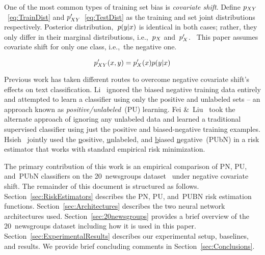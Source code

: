 \documentclass[]{subfiles}
\begin{document}
One of the most common types of training set bias is \textit{covariate shift}. Define $p_{XY}$~\eqref{eq:TrainDist} and ${p_{XY}'}$~\eqref{eq:TestDist} as the training and set joint distributions respectively.  Posterior distribution,~${p(y \vert x)}$ is identical in both cases; rather, they only differ in their marginal distributions, i.e.,~$p_{X}$ and~${p_{X}'}$.~\cite{Huang:2006}  This paper assumes covariate shift for only one class, i.e.,~the negative one.

\begin{equation}\label{eq:TestDist}
    p_{XY}'(x,y) = p_{X}'(x) p(y \vert x)
\end{equation}

Previous work has taken different routes to overcome negative covariate shift's effects on text classification.  Li\etal~\cite{Li:2010} ignored the biased negative training data entirely and attempted to learn a classifier using only the positive and unlabeled sets -- an approach known as \textit{positive\-/unlabeled}~(PU) learning.  Fei \&~Liu~\cite{Fei:2015} took the alternate approach of ignoring any unlabeled data and learned a traditional supervised classifier using just the positive and biased-negative training examples.  Hsieh\etal~\cite{Hsieh:2018} jointly used the \underline{p}ositive, \underline{u}nlabeled, and \underline{b}iased \underline{n}egative~(PUbN) in a risk estimator that works with standard empirical risk minimization.

The primary contribution of this work is an empirical comparison of PN, PU, and~PUbN classifiers on the 20~newsgroups dataset~\cite{20newsgroups} under negative covariate shift.  The remainder of this document is structured as follows.  Section~\ref{sec:RiskEstimators} describes the PN, PU, and~PUBN risk estimation functions. Section~\ref{sec:Architectures} describes the two neural network architectures used. Section~\ref{sec:20newsgroups} provides a brief overview of the 20~newsgroups dataset including how it is used in this paper. Section~\ref{sec:ExperimentalResults} describes our experimental setup, baselines, and results.  We provide brief concluding comments in Section~\ref{sec:Conclusions}.
\end{document}
